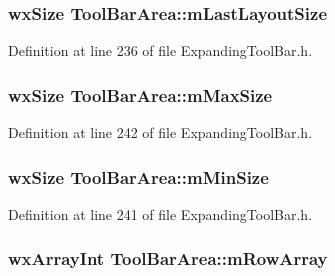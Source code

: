 \subsubsection[{\texorpdfstring{m\+Last\+Layout\+Size}{mLastLayoutSize}}]{\setlength{\rightskip}{0pt plus 5cm}wx\+Size Tool\+Bar\+Area\+::m\+Last\+Layout\+Size\hspace{0.3cm}{\ttfamily [protected]}}\hypertarget{class_tool_bar_area_a0103098d46d91ec590a843710bf04d8b}{}\label{class_tool_bar_area_a0103098d46d91ec590a843710bf04d8b}


Definition at line 236 of file Expanding\+Tool\+Bar.\+h.

\subsubsection[{\texorpdfstring{m\+Max\+Size}{mMaxSize}}]{\setlength{\rightskip}{0pt plus 5cm}wx\+Size Tool\+Bar\+Area\+::m\+Max\+Size\hspace{0.3cm}{\ttfamily [protected]}}\hypertarget{class_tool_bar_area_aca2d686db186f0698a62431edeaf9e16}{}\label{class_tool_bar_area_aca2d686db186f0698a62431edeaf9e16}


Definition at line 242 of file Expanding\+Tool\+Bar.\+h.

\subsubsection[{\texorpdfstring{m\+Min\+Size}{mMinSize}}]{\setlength{\rightskip}{0pt plus 5cm}wx\+Size Tool\+Bar\+Area\+::m\+Min\+Size\hspace{0.3cm}{\ttfamily [protected]}}\hypertarget{class_tool_bar_area_a7284a019ace30ed7a1b98e1be94d251f}{}\label{class_tool_bar_area_a7284a019ace30ed7a1b98e1be94d251f}


Definition at line 241 of file Expanding\+Tool\+Bar.\+h.

\subsubsection[{\texorpdfstring{m\+Row\+Array}{mRowArray}}]{\setlength{\rightskip}{0pt plus 5cm}wx\+Array\+Int Tool\+Bar\+Area\+::m\+Row\+Array\hspace{0.3cm}{\ttfamily [protected]}}\hypertarget{class_tool_bar_area_ab89bf273c38f4566b0570742049be5f0}{}\label{class_tool_bar_area_ab89bf273c38f4566b0570742049be5f0}


